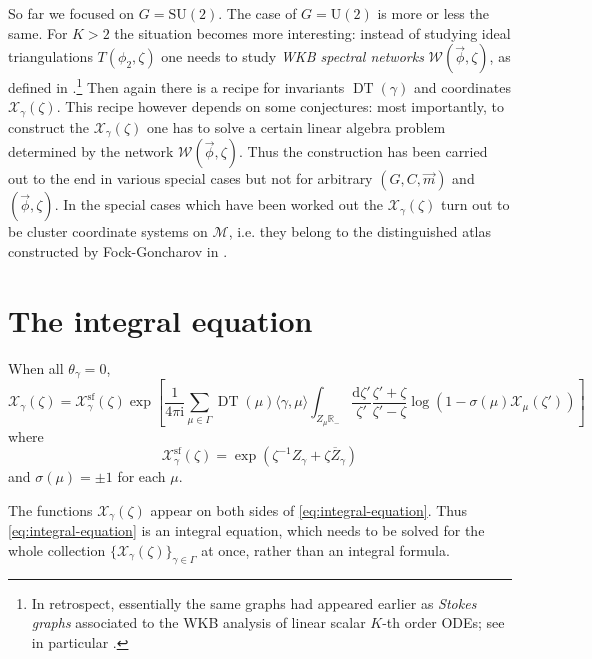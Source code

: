 \documentclass[12pt,letterpaper,reqno]{article}
\numberwithin{equation}{section}
\newcommand{\cM}{\ensuremath{\mathcal M}}
\newcommand{\cX}{\ensuremath{\mathcal X}}
\newcommand{\cW}{\ensuremath{\mathcal W}}
\newcommand{\R}{\ensuremath{\mathbb R}}
\newcommand{\I}{{\mathrm i}}
\newcommand{\de}{\mathrm{d}}
\renewcommand{\sf}{\mathrm{sf}}
\newcommand{\IP}[1]{\langle#1\rangle}
\newcommand{\vphi}{{\vec\phi}}
\newcommand{\ti}[1]{\textit{#1}}
\DeclareMathOperator{\DT}{DT}
\newcommand{\SU}{\mathrm{SU}}
\newcommand{\U}{\mathrm{U}}
\begin{document}
\begin{remark} \label{rem:higher-rank}
So far we focused on $G = \SU(2)$. The case of $G = \U(2)$ is more or
less the same. For $K>2$ the situation becomes more interesting:
instead of studying ideal triangulations $T(\phi_2, \zeta)$ 
one needs to study \ti{WKB spectral networks} $\cW(\vphi, \zeta)$, as defined in \cite{Gaiotto2012}.\footnote{In retrospect,
essentially the same graphs had appeared earlier as 
\ti{Stokes graphs} associated to the WKB analysis of
linear scalar $K$-th order ODEs; see in particular \cite{berk:988}.}
Then again there is a recipe for invariants $\DT(\gamma)$
and coordinates $\cX_\gamma(\zeta)$. This recipe however 
depends on some conjectures:
most importantly, to construct the $\cX_\gamma(\zeta)$ 
one has to solve a certain linear algebra problem determined by the 
network $\cW(\vphi,\zeta)$.
Thus the construction has been carried out to the end in various special
cases but not for arbitrary $(G,C,\vec{m})$ and $(\vphi, \zeta)$. In the special cases which have been worked out
\cite{Gaiotto:2012db,Neitzke:2017yos} the $\cX_\gamma(\zeta)$
turn out to be cluster coordinate systems on $\cM$,
i.e. they belong to the distinguished atlas constructed
by Fock-Goncharov in \cite{MR2233852}.
\end{remark}

\section{The integral equation} \label{sec:integral-equations}

\begin{conj}[Integral equation for $\theta_\gamma = 0$] \label{conj:integral-equation}
When all $\theta_\gamma = 0$,
\begin{equation} \label{eq:integral-equation}
  \cX_\gamma(\zeta) = \cX_\gamma^\sf(\zeta) \exp \left[ \frac{1}{4\pi \I} \sum_{\mu \in \Gamma} \DT(\mu) \IP{\gamma,\mu} \int_{Z_\mu \R_-} \frac{\de \zeta'}{\zeta'} \frac{\zeta' + \zeta}{\zeta'-\zeta} \log(1 - \sigma(\mu) \cX_\mu(\zeta')) \right]
\end{equation}
where 
\begin{equation}
  \cX_\gamma^\sf(\zeta) = \exp \left( \zeta^{-1} Z_\gamma + \zeta \overline{Z}_\gamma \right)
\end{equation}
and $\sigma(\mu) = \pm 1$ for each $\mu$.
\end{conj}
The functions $\cX_\gamma(\zeta)$ appear on both sides of
\eqref{eq:integral-equation}. Thus \eqref{eq:integral-equation} is an integral equation, which needs to be solved for 
the whole collection $\{\cX_\gamma(\zeta)\}_{\gamma \in \Gamma}$
at once, rather than an integral formula.
\end{document}
